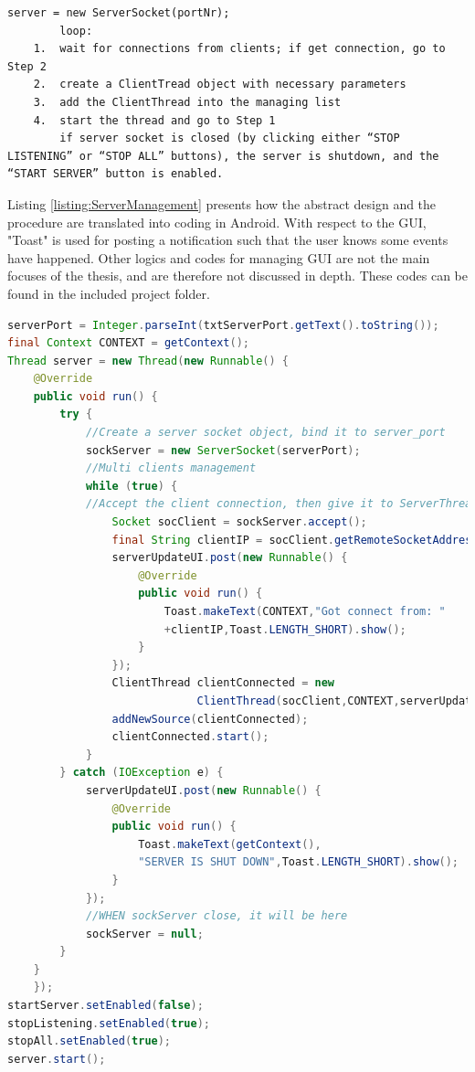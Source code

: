 \begin{lstlisting}[caption={Pseudo code to manage connections}, label = {listing:PseudoServerManagement}, captionpos=b]
	server = new ServerSocket(portNr);
		loop:
	1.  wait for connections from clients; if get connection, go to Step 2
	2.  create a ClientTread object with necessary parameters
	3.  add the ClientThread into the managing list
	4.  start the thread and go to Step 1
		if server socket is closed (by clicking either “STOP LISTENING” or “STOP ALL” buttons), the server is shutdown, and the “START SERVER” button is enabled.
\end{lstlisting}
Listing \ref{listing:ServerManagement} presents how the abstract design and the procedure are translated into coding in Android. With respect to the GUI, "Toast" is used for posting a notification such that the user knows some events have happened. Other logics and codes for managing GUI are not the main focuses of the thesis, and are therefore not discussed in depth. These codes can be found in the included project folder.\\
\begin{lstlisting}[caption={Server management}, label = {listing:ServerManagement}, captionpos=b, language=Java]
serverPort = Integer.parseInt(txtServerPort.getText().toString());
final Context CONTEXT = getContext();
Thread server = new Thread(new Runnable() {
	@Override
	public void run() {
	    try {
	        //Create a server socket object, bind it to server_port
	        sockServer = new ServerSocket(serverPort);
	        //Multi clients management
	        while (true) {
	        //Accept the client connection, then give it to ServerThread with client socket
	            Socket socClient = sockServer.accept();
	            final String clientIP = socClient.getRemoteSocketAddress().toString();
	            serverUpdateUI.post(new Runnable() {
	                @Override
	                public void run() {
	                    Toast.makeText(CONTEXT,"Got connect from: "
	                    +clientIP,Toast.LENGTH_SHORT).show();
	                }
	            });
	            ClientThread clientConnected = new 
	                         ClientThread(socClient,CONTEXT,serverUpdateUI, selv);
	            addNewSource(clientConnected);
	            clientConnected.start();
	        }
	    } catch (IOException e) {
	        serverUpdateUI.post(new Runnable() {
	            @Override
	            public void run() {
	                Toast.makeText(getContext(),
	                "SERVER IS SHUT DOWN",Toast.LENGTH_SHORT).show();
	            }
	        });
	        //WHEN sockServer close, it will be here
	        sockServer = null;
	    }
	}
	});
startServer.setEnabled(false);
stopListening.setEnabled(true);
stopAll.setEnabled(true);
server.start();
\end{lstlisting}
